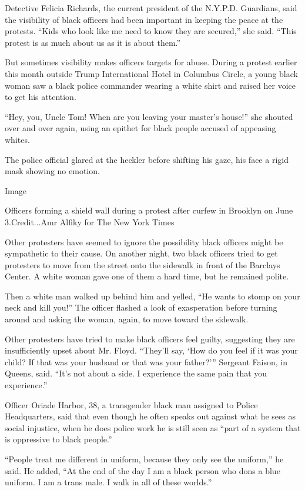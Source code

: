 Detective Felicia Richards, the current president of the N.Y.P.D.
Guardians, said the visibility of black officers had been important in
keeping the peace at the protests. ``Kids who look like me need to know
they are secured,'' she said. ``This protest is as much about us as it
is about them.''

But sometimes visibility makes officers targets for abuse. During a
protest earlier this month outside Trump International Hotel in Columbus
Circle, a young black woman saw a black police commander wearing a white
shirt and raised her voice to get his attention.

``Hey, you, Uncle Tom! When are you leaving your master's house!'' she
shouted over and over again, using an epithet for black people accused
of appeasing whites.

The police official glared at the heckler before shifting his gaze, his
face a rigid mask showing no emotion.

Image

Officers forming a shield wall during a protest after curfew in Brooklyn
on June 3.Credit...Amr Alfiky for The New York Times

Other protesters have seemed to ignore the possibility black officers
might be sympathetic to their cause. On another night, two black
officers tried to get protesters to move from the street onto the
sidewalk in front of the Barclays Center. A white woman gave one of them
a hard time, but he remained polite.

Then a white man walked up behind him and yelled, ``He wants to stomp on
your neck and kill you!'' The officer flashed a look of exasperation
before turning around and asking the woman, again, to move toward the
sidewalk.

Other protesters have tried to make black officers feel guilty,
suggesting they are insufficiently upset about Mr. Floyd. ``They'll say,
`How do you feel if it was your child? If that was your husband or that
was your father?''' Sergeant Faison, in Queens, said. ``It's not about a
side. I experience the same pain that you experience.''

Officer Oriade Harbor, 38, a transgender black man assigned to Police
Headquarters, said that even though he often speaks out against what he
sees as social injustice, when he does police work he is still seen as
``part of a system that is oppressive to black people.''

``People treat me different in uniform, because they only see the
uniform,'' he said. He added, ``At the end of the day I am a black
person who dons a blue uniform. I am a trans male. I walk in all of
these worlds.''

